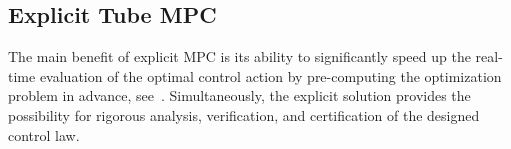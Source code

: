 \documentclass[letterpaper, 10 pt, conference]{ieeeconf}
\begin{document}
%
%

\subsection{Explicit Tube MPC}
\label{sec:explicit_mpc}

The main benefit of explicit MPC is its ability to significantly speed up the real-time evaluation of the optimal control action by pre-computing the optimization problem in advance, see~\cite{BM02}. Simultaneously, the explicit solution provides the possibility for rigorous analysis, verification, and certification of the designed control law. 
\end{document}
